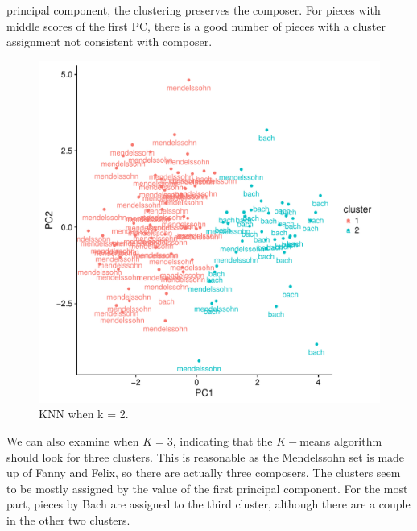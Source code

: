 \documentclass[12pt,twoside]{reedthesis}
\theoremstyle{definition}
\theoremstyle{definition}
\theoremstyle{definition}
\theoremstyle{remark}
\begin{document}
principal component, the clustering preserves the composer. For pieces
with middle scores of the first PC, there is a good number of pieces
with a cluster assignment not consistent with composer.
\begin{figure}[H]
\centering
\includegraphics[scale = .7]{images/kmeans_2_b.pdf}
\caption{KNN when k = 2.}
\label{subd}
\end{figure}
We can also examine when \(K=3\), indicating that the \(K-\)means
algorithm should look for three clusters. This is reasonable as the
Mendelssohn set is made up of Fanny and Felix, so there are actually
three composers. The clusters seem to be mostly assigned by the value of
the first principal component. For the most part, pieces by Bach are
assigned to the third cluster, although there are a couple in the other
two clusters.
\end{document}
